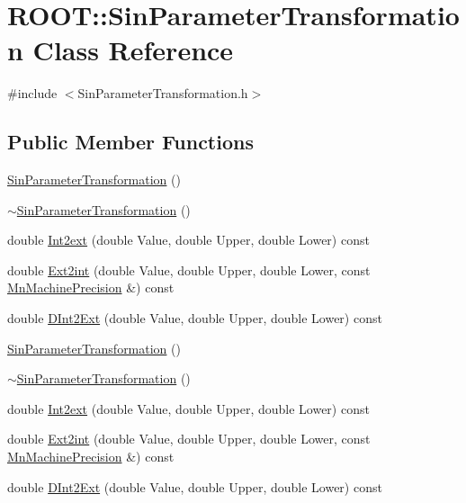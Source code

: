 \hypertarget{classROOT_1_1Minuit2_1_1SinParameterTransformation}{}\section{R\+O\+OT\+:\+:Sin\+Parameter\+Transformation Class Reference}
\label{classROOT_1_1Minuit2_1_1SinParameterTransformation}


{\ttfamily \#include $<$Sin\+Parameter\+Transformation.\+h$>$}

\subsection*{Public Member Functions}
\begin{DoxyCompactItemize}
\item 
\mbox{\hyperlink{classROOT_1_1Minuit2_1_1SinParameterTransformation_a54b8892f35f480210a431f1001634b9c}{Sin\+Parameter\+Transformation}} ()
\item 
\mbox{\hyperlink{classROOT_1_1Minuit2_1_1SinParameterTransformation_a5e6632c4e6006393041a63031b64f823}{$\sim$\+Sin\+Parameter\+Transformation}} ()
\item 
double \mbox{\hyperlink{classROOT_1_1Minuit2_1_1SinParameterTransformation_a53590482bc5734d9f079c8c5054d3de6}{Int2ext}} (double Value, double Upper, double Lower) const
\item 
double \mbox{\hyperlink{classROOT_1_1Minuit2_1_1SinParameterTransformation_a5a98af7b966742b4d3c90ab6d6bbeb5a}{Ext2int}} (double Value, double Upper, double Lower, const \mbox{\hyperlink{classROOT_1_1Minuit2_1_1MnMachinePrecision}{Mn\+Machine\+Precision}} \&) const
\item 
double \mbox{\hyperlink{classROOT_1_1Minuit2_1_1SinParameterTransformation_a4335749e9dd572c2234a8a119893e3fd}{D\+Int2\+Ext}} (double Value, double Upper, double Lower) const
\item 
\mbox{\hyperlink{classROOT_1_1Minuit2_1_1SinParameterTransformation_a54b8892f35f480210a431f1001634b9c}{Sin\+Parameter\+Transformation}} ()
\item 
\mbox{\hyperlink{classROOT_1_1Minuit2_1_1SinParameterTransformation_a5e6632c4e6006393041a63031b64f823}{$\sim$\+Sin\+Parameter\+Transformation}} ()
\item 
double \mbox{\hyperlink{classROOT_1_1Minuit2_1_1SinParameterTransformation_a53590482bc5734d9f079c8c5054d3de6}{Int2ext}} (double Value, double Upper, double Lower) const
\item 
double \mbox{\hyperlink{classROOT_1_1Minuit2_1_1SinParameterTransformation_a5a98af7b966742b4d3c90ab6d6bbeb5a}{Ext2int}} (double Value, double Upper, double Lower, const \mbox{\hyperlink{classROOT_1_1Minuit2_1_1MnMachinePrecision}{Mn\+Machine\+Precision}} \&) const
\item 
double \mbox{\hyperlink{classROOT_1_1Minuit2_1_1SinParameterTransformation_a4335749e9dd572c2234a8a119893e3fd}{D\+Int2\+Ext}} (double Value, double Upper, double Lower) const
\end{DoxyCompactItemize}


